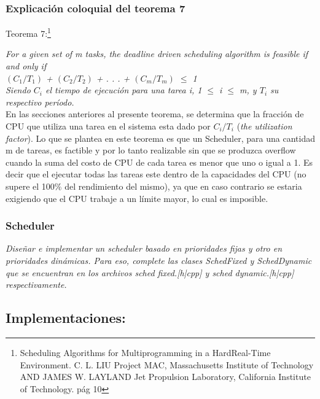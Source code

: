 \documentclass[a4paper]{article}
\begin{document}
 \newpage
\subsubsection{Explicaci\'on coloquial del teorema 7}

Teorema 7:\footnote{Scheduling Algorithms for Multiprogramming in a HardReal-Time Environment.
C. L. LIU Project MAC, Massachusetts Institute of Technology AND JAMES W. LAYLAND Jet Propulsion Laboratory, California Institute of Technology. pág 10}

\textit {For a given set of m tasks, the deadline driven scheduling algorithm
is feasible if and only if }\\
 
 \textit {$(C_1/T_1)$ + $(C_2/T_2)$ + . . . + $(C_m/T_m)$ $\leq$ 1 } \\

\textit{Siendo $C_i$ el tiempo de ejecuci\'on para una tarea i, 1 $\leq$ i $\leq$ m, y $T_i$ su respectivo per\'iodo.}\\

En las secciones anteriores al presente teorema, se determina que la fracción de CPU que utiliza una tarea en el sistema esta dado por $C_i/T_i$ (\textit{the utilization factor}). Lo que se plantea en este teorema es que un Scheduler, para una cantidad m de tareas, es factible y por lo tanto realizable sin que se produzca overflow cuando la suma del costo de CPU de cada tarea es menor que uno o igual a 1. Es decir que el ejecutar todas las tareas este dentro de la capacidades del CPU (no supere el 100\% del rendimiento del mismo), ya que en caso contrario se estaria exigiendo que el CPU trabaje a un l\'imite mayor, lo cual es imposible. \\




\subsubsection{Scheduler}
\textit{Dise\~nar e implementar un scheduler basado en prioridades fijas y otro en prioridades din\'amicas. Para eso, complete las clases SchedFixed y SchedDynamic que se encuentran en los archivos sched fixed.[h|cpp] y sched dynamic.[h|cpp] respectivamente.}\\

\subsection*{Implementaciones:}
\end{document}
